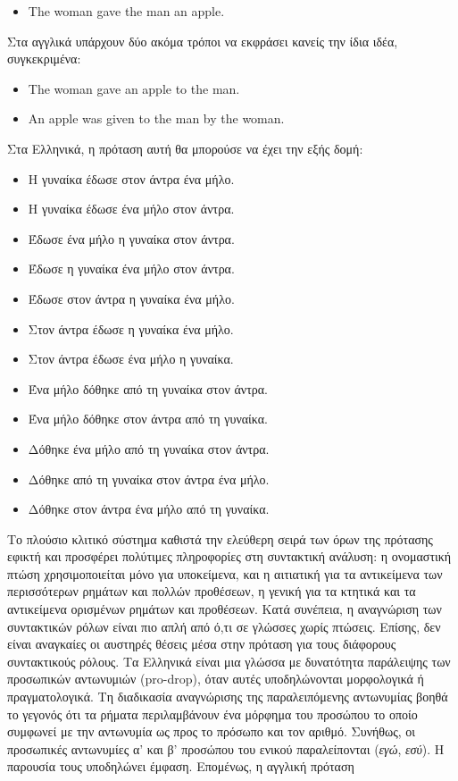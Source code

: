 \documentclass[]{../../metanetpaper}
\begin{document}
\begin{multicols}{2}
\begin{itemize}
\item[] The woman gave the man an apple.
\end{itemize}

Στα αγγλικά υπάρχουν δύο ακόμα τρόποι να εκφράσει κανείς την ίδια ιδέα, συγκεκριμένα:

\begin{itemize}
\item The woman gave an apple to the man.
\item An apple was given to the man by the woman.
\end{itemize}

Στα Ελληνικά, η πρόταση αυτή θα μπορούσε να έχει την εξής δομή:

\begin{itemize}    
\item Η γυναίκα έδωσε στον άντρα ένα μήλο.
\item Η γυναίκα έδωσε ένα μήλο στον άντρα.
\item Έδωσε ένα μήλο η γυναίκα στον άντρα.
\item Έδωσε η γυναίκα ένα μήλο στον άντρα.
\item Έδωσε στον άντρα η γυναίκα ένα μήλο.
\item Στον άντρα έδωσε η γυναίκα ένα μήλο.
\item Στον άντρα έδωσε ένα μήλο η γυναίκα.
\item Ένα μήλο δόθηκε από τη γυναίκα στον άντρα.
\item Ένα μήλο δόθηκε στον άντρα από τη γυναίκα.
\item Δόθηκε ένα μήλο από τη γυναίκα στον άντρα.
\item Δόθηκε από τη γυναίκα στον άντρα ένα μήλο.
\item Δόθηκε στον άντρα ένα μήλο από τη γυναίκα.
\end{itemize}

Το πλούσιο κλιτικό σύστημα καθιστά την ελεύθερη σειρά των όρων της πρότασης εφικτή και προσφέρει πολύτιμες πληροφορίες στη συντακτική ανάλυση: η ονομαστική πτώση χρησιμοποιείται μόνο για υποκείμενα, και η αιτιατική για τα αντικείμενα των περισσότερων ρημάτων και πολλών προθέσεων, η γενική για τα κτητικά και τα αντικείμενα ορισμένων ρημάτων και προθέσεων. Κατά συνέπεια, η αναγνώριση των συντακτικών ρόλων είναι πιο απλή από ό,τι σε γλώσσες χωρίς πτώσεις. Επίσης, δεν είναι αναγκαίες οι αυστηρές θέσεις μέσα στην πρόταση για τους διάφορους συντακτικούς ρόλους.  
Τα Ελληνικά είναι μια γλώσσα με δυνατότητα παράλειψης των προσωπικών αντωνυμιών (pro-drop), όταν αυτές υποδηλώνονται μορφολογικά ή πραγματολογικά. Τη διαδικασία αναγνώρισης της παραλειπόμενης αντωνυμίας βοηθά το γεγονός ότι τα ρήματα περιλαμβάνουν ένα μόρφημα του προσώπου το οποίο συμφωνεί με την αντωνυμία ως προς το πρόσωπο και τον αριθμό. Συνήθως, οι προσωπικές αντωνυμίες α' και β' προσώπου του ενικού παραλείπονται (\textit{εγώ}, \textit{εσύ}). Η παρουσία τους υποδηλώνει έμφαση. Επομένως, η αγγλική πρόταση


\end{multicols}
\end{document}
